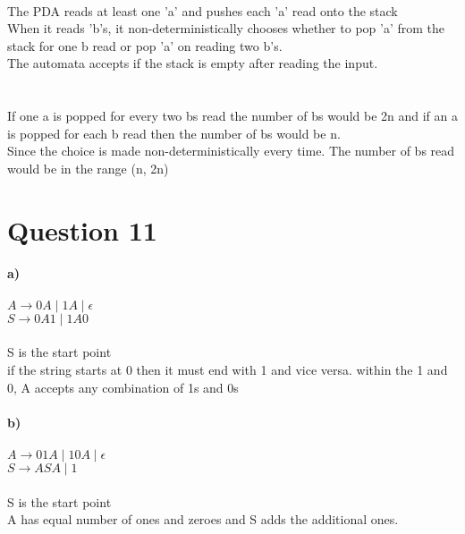 \documentclass[11pt]{article}
\begin{document}
\\
The PDA reads at least one 'a' and pushes each 'a' read onto the stack \\
When it reads 'b's, it non-deterministically chooses whether to pop 'a'
from the stack for one b read or pop 'a' on reading two b's. \\
The automata accepts if the stack is empty after reading the input. \\
\\ \\
If one a is popped for every two bs read the number of bs would be 2n
and if an a is popped for each b read then the number of bs would be n. \\
Since the choice is made non-deterministically every time. The number of bs
read would be in the range (n, 2n)

\section*{Question 11}
\textbf{a)} \\
\\
$A \rightarrow 0A \;|\; 1A \;|\; \epsilon $ \\
$S \rightarrow 0A1 \;|\; 1A0 $ \\
\\
S is the start point \\
if the string starts at 0 then it must end with 1 and vice versa.
within the 1 and 0, A accepts any combination of 1s and 0s \\
\\
\textbf{b)} \\
\\
$A \rightarrow 01A \;|\; 10A \;|\; \epsilon$ \\
$S \rightarrow ASA \;|\; 1$ \\
\\
S is the start point \\
A has equal number of ones and zeroes and S adds the additional ones.
\end{document}
